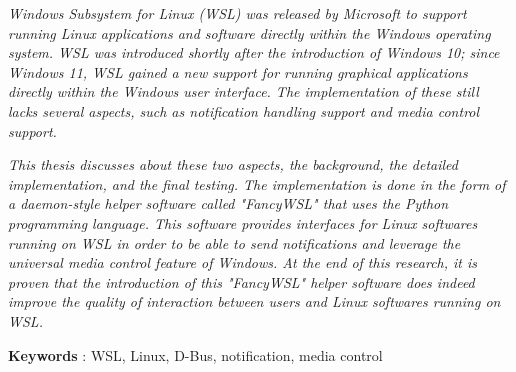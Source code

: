 \textit{
Windows Subsystem for Linux (WSL) was released by Microsoft to support running Linux applications and software directly within the Windows operating system. WSL was introduced shortly after the introduction of Windows 10; since Windows 11, WSL gained a new support for running graphical applications directly within the Windows user interface. The implementation of these still lacks several aspects, such as notification handling support and media control support.}

\textit{This thesis discusses about these two aspects, the background, the detailed implementation, and the final testing. The implementation is done in the form of a daemon-style helper software called "FancyWSL" that uses the Python programming language. This software provides interfaces for Linux softwares running on WSL in order to be able to send notifications and leverage the universal media control feature of Windows. At the end of this research, it is proven that the introduction of this "FancyWSL" helper software does indeed improve the quality of interaction between users and Linux softwares running on WSL.
}

\noindent\textbf{Keywords} : WSL, Linux, D-Bus, notification, media control
